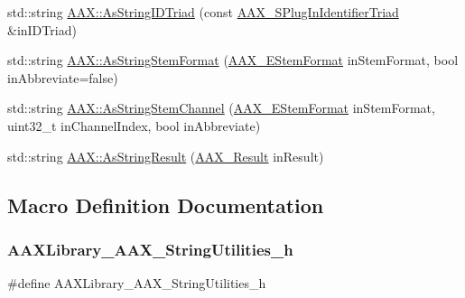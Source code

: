 \begin{DoxyCompactItemize}
\item 
std\+::string \mbox{\hyperlink{a00852_a89e00fcb44e30c443bebba0f026ef62a}{A\+A\+X\+::\+As\+String\+I\+D\+Triad}} (const \mbox{\hyperlink{a01425}{A\+A\+X\+\_\+\+S\+Plug\+In\+Identifier\+Triad}} \&in\+I\+D\+Triad)
\item 
std\+::string \mbox{\hyperlink{a00852_a34d219233eb5c9836b837fa2a67150d1}{A\+A\+X\+::\+As\+String\+Stem\+Format}} (\mbox{\hyperlink{a00491_ad8af5ef008b2bd478add9a0acb0a1d85}{A\+A\+X\+\_\+\+E\+Stem\+Format}} in\+Stem\+Format, bool in\+Abbreviate=false)
\item 
std\+::string \mbox{\hyperlink{a00852_adfab6bf193c09266ecec2069b8da0c5c}{A\+A\+X\+::\+As\+String\+Stem\+Channel}} (\mbox{\hyperlink{a00491_ad8af5ef008b2bd478add9a0acb0a1d85}{A\+A\+X\+\_\+\+E\+Stem\+Format}} in\+Stem\+Format, uint32\+\_\+t in\+Channel\+Index, bool in\+Abbreviate)
\item 
std\+::string \mbox{\hyperlink{a00852_a354029650cebc5f23636c9984a65ea0d}{A\+A\+X\+::\+As\+String\+Result}} (\mbox{\hyperlink{a00392_a4d8f69a697df7f70c3a8e9b8ee130d2f}{A\+A\+X\+\_\+\+Result}} in\+Result)
\end{DoxyCompactItemize}


\subsection{Macro Definition Documentation}
\mbox{\label{a00677_aea61cbef0d0ebbae3c538af4531460df}} 
\subsubsection{\texorpdfstring{AAXLibrary\_AAX\_StringUtilities\_h}{AAXLibrary\_AAX\_StringUtilities\_h}}
{\footnotesize\ttfamily \#define A\+A\+X\+Library\+\_\+\+A\+A\+X\+\_\+\+String\+Utilities\+\_\+h}

